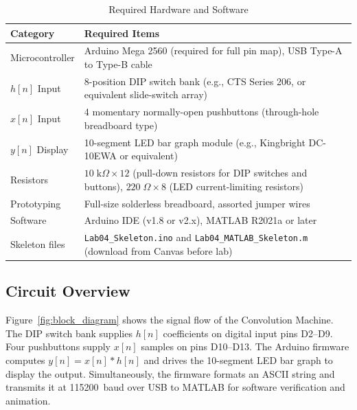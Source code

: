 \documentclass[11pt,letterpaper]{article}
\begin{document}
\begin{table}[H]
    \centering
    \caption{Required Hardware and Software}
    \label{tab:equipment}
    \begin{tabularx}{\linewidth}{l X}
    \toprule
    \textbf{Category} & \textbf{Required Items}\\
    \midrule
    Microcontroller   & Arduino Mega 2560 (required for full pin map), USB Type-A to Type-B cable\\
    $h[n]$ Input      & 8-position DIP switch bank (e.g., CTS Series 206, or equivalent slide-switch array)\\
    $x[n]$ Input      & 4 momentary normally-open pushbuttons (through-hole breadboard type)\\
    $y[n]$ Display    & 10-segment LED bar graph module (e.g., Kingbright DC-10EWA or equivalent)\\
    Resistors         & $10\;\mathrm{k}\Omega \times 12$ (pull-down resistors for DIP switches and buttons), $220\;\Omega \times 8$ (LED current-limiting resistors)\\
    Prototyping       & Full-size solderless breadboard, assorted jumper wires\\
    Software          & Arduino IDE (v1.8 or v2.x), MATLAB R2021a or later\\
    Skeleton files    & \texttt{Lab04\_Skeleton.ino} and \texttt{Lab04\_MATLAB\_Skeleton.m} (download from Canvas before lab)\\
    \bottomrule
    \end{tabularx}
\end{table}

\subsection{Circuit Overview}

Figure~\ref{fig:block_diagram} shows the signal flow of the Convolution Machine. The DIP switch bank supplies $h[n]$ coefficients on digital input pins D2--D9. Four pushbuttons supply $x[n]$ samples on pins D10--D13. The Arduino firmware computes $y[n] = x[n] * h[n]$ and drives the 10-segment LED bar graph to display the output. Simultaneously, the firmware formats an ASCII string and transmits it at 115200~baud over USB to MATLAB for software verification and animation.
\end{document}
